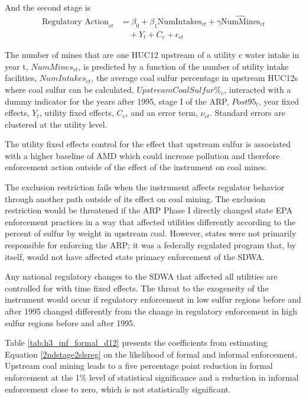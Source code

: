\documentclass[12pt]{article}
\begin{document}
And the second stage is
\begin{equation}\label{2ndstage2slsreg}
\begin{split}
\text{Regulatory Action}_{ct} &= \beta_0 + \beta_1\text{NumIntakes}_{ct} + \gamma\widehat{\text{NumMines}}_{ct} \\
&\quad + Y_t + C_c + \epsilon_{ct}
\end{split}
\end{equation}

The number of mines that are one HUC12 upstream of a utility c water intake in year t, $NumMines_{ct}$, is predicted by a function of the number of utility intake facilities, $NumIntakes_{ct}$, the average coal sulfur percentage in upstream HUC12s where coal sulfur can be calculated, $UpstreamCoalSulfur\%_c$, interacted with a dummy indicator for the years after 1995, stage I of the ARP, $Post95_t$, year fixed effects, $Y_t$, utility fixed effects, $C_c$, and an error term, $\nu_{ct}$. Standard errors are clustered at the utility level.

The utility fixed effects control for the effect that upstream sulfur is associated with a higher baseline of AMD which could increase pollution and therefore enforcement action outside of the effect of the instrument on coal mines.

The exclusion restriction fails when the instrument affects regulator behavior through another path outside of its effect on coal mining. The exclusion restriction would be threatened if the ARP Phase I directly changed state EPA enforcement practices in a way that affected utilities differently according to the percent of sulfur by weight in upstream coal. However, states were not primarily responsible for enforcing the ARP; it was a federally regulated program that, by itself, would not have affected state primacy enforcement of the SDWA.

Any national regulatory changes to the SDWA that affected all utilities are controlled for with time fixed effects. The threat to the exogeneity of the instrument would occur if regulatory enforcement in low sulfur regions before and after 1995 changed differently from the change in regulatory enforcement in high sulfur regions before and after 1995.

Table \ref{tab:h3_inf_formal_d12} presents the coefficients from estimating Equation \ref{2ndstage2slsreg} on the likelihood of formal and informal enforcement. Upstream coal mining leads to a five percentage point reduction in formal enforcement at the 1\% level of statistical significance and a reduction in informal enforcement close to zero, which is not statistically significant.
\end{document}
